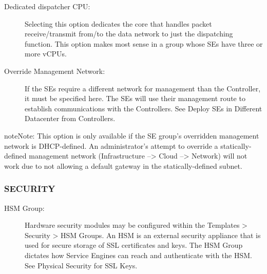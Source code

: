 \documentclass[letterpaper,10pt,english]{sphinxmanual}
\begin{document}
\begin{description}
\item[{Dedicated dispatcher CPU:}] \leavevmode
Selecting this option dedicates the core that handles packet receive/transmit from/to the data network to just the dispatching function. This option makes most sense in a group whose SEs have three or more vCPUs.

\item[{Override Management Network:}] \leavevmode
If the SEs require a different network for management than the Controller, it must be specified here. The SEs will use their management route to establish communications with the Controllers.  See Deploy SEs in Different Datacenter from Controllers.

\end{description}

\begin{sphinxadmonition}{note}{Note:}
This option is only available if the SE group's overridden management network is DHCP-defined. An administrator's attempt to override a statically-defined management network (Infrastructure --\textgreater{} Cloud --\textgreater{} Network) will not work due to not allowing a default gateway in the statically-defined subnet.
\end{sphinxadmonition}


\subsubsection{SECURITY}
\label{\detokenize{getting_started/service_engine_group:security}}\begin{description}
\item[{HSM Group:}] \leavevmode
Hardware security modules may be configured within the Templates \textgreater{} Security \textgreater{} HSM Groups.  An HSM is an external security appliance that is used for secure storage of SSL certificates and keys.  The HSM Group dictates how Service Engines can reach and authenticate with the HSM.  See Physical Security for SSL Keys.

\end{description}
\end{document}
